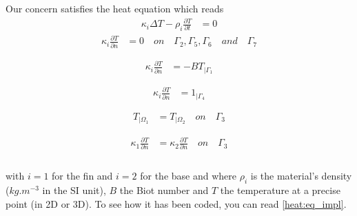Our concern satisfies the heat equation which reads 
\begin{equation}
\label{heat:eq}
   \begin{split}
      \displaystyle{\kappa_i \Delta T - \rho_i \frac{ \partial T}{\partial t}}  & = 0
  \end{split}
\end{equation}
\begin{equation}
\label{hom_neu}
   \begin{split}
      \displaystyle{ \kappa_i \frac{\partial T}{\partial n}} & =  0 \quad on \quad \Gamma_2,\Gamma_5, \Gamma_6 \quad and \quad \Gamma_7 \\ \\ 
  \end{split}
\end{equation}
\begin{equation}
\label{classic_neu}
   \begin{split}
      \displaystyle{ \kappa_i \frac{\partial T}{\partial n}} & = - B T_{ | \Gamma_1 } \\ \\
  \end{split}
\end{equation}
\begin{equation}
\label{nonhom_neu}
   \begin{split}
      \displaystyle{ \kappa_i \frac{\partial T}{\partial n}} & =  1_{| \Gamma_4} \\ \\
  \end{split}
\end{equation}
\begin{equation}
\label{temp_conti}
   \begin{split}
      T_{| \varOmega_1} & = T_{| \varOmega_2} \quad on \quad \Gamma_3 \\ \\
  \end{split}
\end{equation}
\begin{equation}
\label{flux_conti}
   \begin{split}
      \displaystyle{ \kappa_1 \frac{\partial T}{\partial n}} & = \displaystyle{ \kappa_2 \frac{\partial T}{\partial n} \quad on \quad \Gamma_3} \\ \\
  \end{split}
\end{equation}

\noindent with $i=1$ for the fin and $i=2$ for the base and where $\rho_i$ is the material's density ($kg.m^{-3}$ in the SI unit), $B$ the Biot number and $T$ the temperature at a precise point (in 2D or 3D). To see how it has been coded, you can read \ref{heat:eq_impl}.

